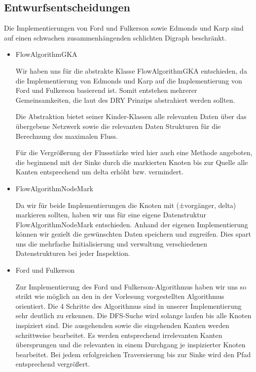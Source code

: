 \documentclass[a4paper]{article}
\begin{document}
\subsection{Entwurfsentscheidungen}

Die Implementierungen von Ford und Fulkerson sowie Edmonds und Karp sind auf einen schwachen zusammenhängenden schlichten Digraph beschränkt.

\begin{itemize}
	\item FlowAlgorithmGKA
	\begin{answer}
		Wir haben uns für die abstrakte Klasse FlowAlgorithmGKA entschieden, da die Implementierung von Edmonds und Karp auf die Implementierung von Ford und Fulkerson basierend ist.
		Somit entstehen mehrerer Gemeinsamkeiten, die laut des DRY Prinzips abstrahiert werden sollten.

		Die Abstraktion bietet seiner Kinder-Klassen alle relevanten Daten über das übergebene Netzwerk sowie die relevanten Daten Strukturen für die Berechnung des maximalen Fluss.

		Für die Vergrößerung der Flussstärke wird hier auch eine Methode angeboten, die beginnend mit der Sinke durch die markierten Knoten bis zur Quelle alle Kanten entsprechend um delta erhöht bzw. vermindert.
	\end{answer}
	\item FlowAlgorithmNodeMark
	\begin{answer}
		Da wir für beide Implementierungen die Knoten mit (±vorgänger, delta) markieren sollten, haben wir uns für eine eigene Datenstruktur FlowAlgorithmNodeMark entschieden.
		Anhand der eigenen Implementierung können wir gezielt die gewünschten Daten speichern und zugreifen.
		Dies spart uns die mehrfache Initialisierung und verwaltung verschiedenen Datenstrukturen bei jeder Inspektion.
	\end{answer}
	\newpage
	\item Ford und Fulkerson
		\begin{answer}
			Zur Implementierung des Ford und Fulkerson-Algorithmus haben wir uns so strikt wie möglich an den in der Vorlesung vorgestellten Algorithmus orientiert.
			Die 4 Schritte des Algorithmus sind in unserer Implementierung sehr deutlich zu erkennen.
			Die DFS-Suche wird solange laufen bis alle Knoten inspiziert sind.
			Die ausgehenden sowie die eingehenden Kanten werden schrittweise bearbeitet.
			Es werden entsprechend irrelevanten Kanten übersprungen und die relevanten in einem Durchgang je inspizierter Knoten bearbeitet.
			Bei jedem erfolgreichen Traversierung bis zur Sinke wird den Pfad entsprechend vergrößert.


\end{answer}
\end{itemize}
\end{document}

